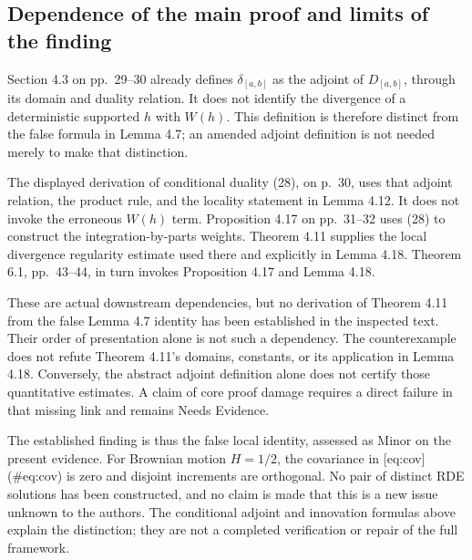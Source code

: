 \documentclass[10pt]{article}
\begin{document}
\subsection*{Dependence of the main proof and limits of the finding}
Section 4.3 on pp. 29–30 already defines \(\delta_{[a,b]}\) as the adjoint of \(D_{[a,b]}\), through its domain and duality relation. It does not identify the divergence of a deterministic supported \(h\) with \(W(h)\). This definition is therefore distinct from the false formula in Lemma 4.7; an amended adjoint definition is not needed merely to make that distinction.\par
The displayed derivation of conditional duality (28), on p. 30, uses that adjoint relation, the product rule, and the locality statement in Lemma 4.12. It does not invoke the erroneous \(W(h)\) term. Proposition 4.17 on pp. 31–32 uses (28) to construct the integration-by-parts weights. Theorem 4.11 supplies the local divergence regularity estimate used there and explicitly in Lemma 4.18. Theorem 6.1, pp. 43–44, in turn invokes Proposition 4.17 and Lemma 4.18.\par
These are actual downstream dependencies, but no derivation of Theorem 4.11 from the false Lemma 4.7 identity has been established in the inspected text. Their order of presentation alone is not such a dependency. The counterexample does not refute Theorem 4.11’s domains, constants, or its application in Lemma 4.18. Conversely, the abstract adjoint definition alone does not certify those quantitative estimates. A claim of core proof damage requires a direct failure in that missing link and remains Needs Evidence.\par
The established finding is thus the false local identity, assessed as Minor on the present evidence. For Brownian motion \(H=1/2\), the covariance in [eq:cov] (\#eq:cov) is zero and disjoint increments are orthogonal. No pair of distinct RDE solutions has been constructed, and no claim is made that this is a new issue unknown to the authors. The conditional adjoint and innovation formulas above explain the distinction; they are not a completed verification or repair of the full framework.\par
\end{document}
